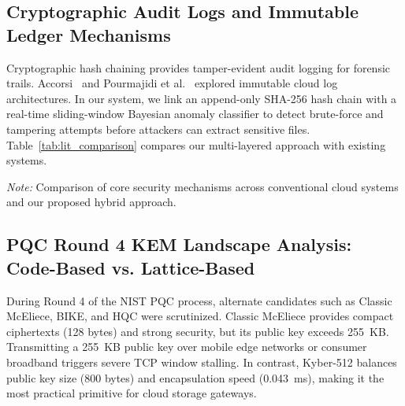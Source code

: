 \documentclass[pdflatex,sn-mathphys,Numbered]{sn-jnl}%
\theoremstyle{thmstyleone}%
\theoremstyle{thmstyletwo}%
\theoremstyle{thmstylethree}%
\begin{document}
\subsection{\textbf{Cryptographic Audit Logs and Immutable Ledger Mechanisms}}
Cryptographic hash chaining provides tamper-evident audit logging for forensic trails. Accorsi~\cite{accorsi2009safe} and Pourmajidi et al.~\cite{pourmajidi2018logchain} explored immutable cloud log architectures. In our system, we link an append-only SHA-256 hash chain with a real-time sliding-window Bayesian anomaly classifier to detect brute-force and tampering attempts before attackers can extract sensitive files. Table~\ref{tab:lit_comparison} compares our multi-layered approach with existing systems.

\begin{table}[!htbp]
\centering
\caption{Architectural comparison across classical, pure post-quantum, and hybrid cloud storage systems.}
\label{tab:lit_comparison}
\vspace{0.3em}
\raggedright\small\textit{Note:} Comparison of core security mechanisms across conventional cloud systems and our proposed hybrid approach.
\end{table}

\subsection{\textbf{PQC Round 4 KEM Landscape Analysis: Code-Based vs. Lattice-Based}}
During Round 4 of the NIST PQC process, alternate candidates such as Classic McEliece, BIKE, and HQC were scrutinized. Classic McEliece provides compact ciphertexts (128 bytes) and strong security, but its public key exceeds 255~KB. Transmitting a 255~KB public key over mobile edge networks or consumer broadband triggers severe TCP window stalling. In contrast, Kyber-512 balances public key size (800 bytes) and encapsulation speed (0.043~ms), making it the most practical primitive for cloud storage gateways.
\end{document}
